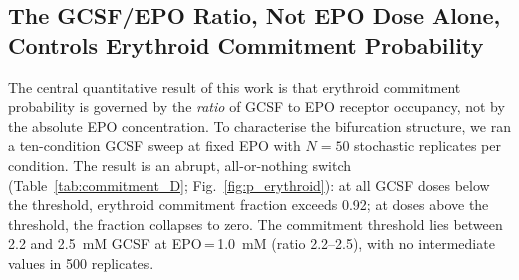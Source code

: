 
\subsection{The GCSF/EPO Ratio, Not EPO Dose Alone, Controls Erythroid
Commitment Probability}
\label{sec:ratio_sweep}

The central quantitative result of this work is that erythroid commitment
probability is governed by the \emph{ratio} of GCSF to EPO receptor occupancy,
not by the absolute EPO concentration. To characterise the bifurcation
structure, we ran a ten-condition GCSF sweep at fixed EPO with $N=50$ stochastic
replicates per condition. The result is an abrupt, all-or-nothing switch
(Table~\ref{tab:commitment_D}; Fig.~\ref{fig:p_erythroid}): at all GCSF doses
below the threshold, erythroid commitment fraction exceeds 0.92; at doses above
the threshold, the fraction collapses to zero. The commitment threshold lies
between 2.2 and 2.5~mM GCSF at EPO\,=\,1.0~mM (ratio 2.2--2.5), with no
intermediate values in 500 replicates.

